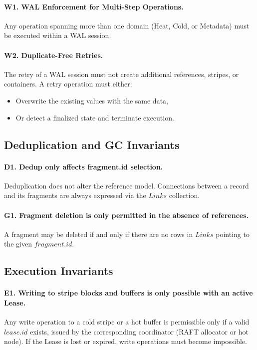 \documentclass[a4paper,12pt]{article}
\begin{document}
    \paragraph{W1. WAL Enforcement for Multi-Step Operations.}
    Any operation spanning more than one domain (Heat, Cold, or Metadata) must be executed within a WAL session.

    \paragraph{W2. Duplicate-Free Retries.}
    The retry of a WAL session must not create additional references, stripes, or containers. A retry operation must either:
    \begin{itemize}
        \item Overwrite the existing values with the same data,
        \item Or detect a finalized state and terminate execution.
    \end{itemize}

    \subsection{Deduplication and GC Invariants}

    \paragraph{D1. Dedup only affects fragment.id selection.}
    Deduplication does not alter the reference model. Connections between a record and its fragments are always expressed via the $Links$ collection.

    \paragraph{G1. Fragment deletion is only permitted in the absence of references.}
    A fragment may be deleted if and only if there are no rows in $Links$ pointing to the given $fragment.id$.

    \subsection{Execution Invariants}

    \paragraph{E1. Writing to stripe blocks and buffers is only possible with an active Lease.}
    Any write operation to a cold stripe or a hot buffer is permissible only if a valid $lease.id$ exists, issued by the corresponding coordinator (RAFT allocator or hot node). If the Lease is lost or expired, write operations must become impossible.
\end{document}
